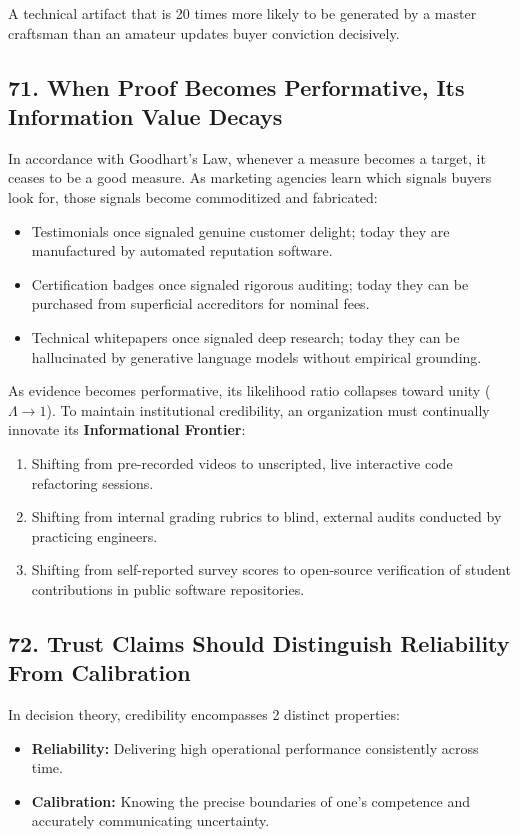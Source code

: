 A technical artifact that is 20 times more likely to be generated by a master craftsman than an amateur updates buyer conviction decisively.

\subsection*{71. When Proof Becomes Performative, Its Information Value Decays}

In accordance with Goodhart's Law, whenever a measure becomes a target, it ceases to be a good measure. As marketing agencies learn which signals buyers look for, those signals become commoditized and fabricated:
\begin{itemize}
\item Testimonials once signaled genuine customer delight; today they are manufactured by automated reputation software.
\item Certification badges once signaled rigorous auditing; today they can be purchased from superficial accreditors for nominal fees.
\item Technical whitepapers once signaled deep research; today they can be hallucinated by generative language models without empirical grounding.
\end{itemize}

As evidence becomes performative, its likelihood ratio collapses toward unity ($\Lambda \rightarrow 1$). To maintain institutional credibility, an organization must continually innovate its \textbf{Informational Frontier}:
\begin{enumerate}
\item Shifting from pre-recorded videos to unscripted, live interactive code refactoring sessions.
\item Shifting from internal grading rubrics to blind, external audits conducted by practicing engineers.
\item Shifting from self-reported survey scores to open-source verification of student contributions in public software repositories.
\end{enumerate}

\subsection*{72. Trust Claims Should Distinguish Reliability From Calibration}

In decision theory, credibility encompasses 2 distinct properties:
\begin{itemize}
\item \textbf{Reliability:} Delivering high operational performance consistently across time.
\item \textbf{Calibration:} Knowing the precise boundaries of one's competence and accurately communicating uncertainty.
\end{itemize}

